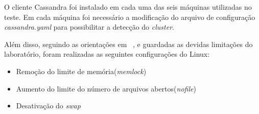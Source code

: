 O cliente Cassandra foi instalado em cada uma das seis máquinas utilizadas no teste. Em cada máquina foi necessário a modificação do arquivo de configuração \emph{cassandra.yaml} para possibilitar a detecção do \emph{cluster}.

Além disso, seguindo as orientações em ~\cite{cassandrasettings}, e guardadas as devidas limitações do laboratório, foram realizadas as seguintes configurações do Linux:
\begin{itemize}
	\item Remoção do limite de memória(\emph{memlock})
	\item Aumento do limite do número de arquivos abertos(\emph{nofile})
	\item Desativação do \emph{swap}
\end{itemize}




